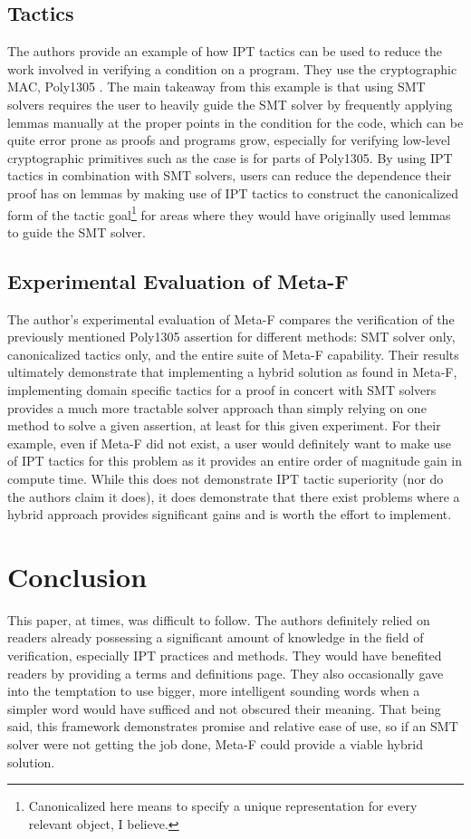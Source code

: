 \documentclass[10pt, journal]{IEEEtran}
\begin{document}
\subsection{Tactics}
The authors provide an example of how IPT tactics can be used to reduce the work involved in verifying a condition on a program. They use the cryptographic MAC, Poly1305 \cite{Bernstein2005}. The main takeaway from this example is that using SMT solvers requires the user to heavily guide the SMT solver by frequently applying lemmas manually at the proper points in the condition for the code, which can be quite error prone as proofs and programs grow, especially for verifying low-level cryptographic primitives such as the case is for parts of Poly1305. By using IPT tactics in combination with SMT solvers, users can reduce the dependence their proof has on lemmas by making use of IPT tactics to construct the canonicalized form of the tactic goal\footnote{Canonicalized here means to specify a unique representation for every relevant object, I believe.} for areas where they would have originally used lemmas to guide the SMT solver.

\subsection{Experimental Evaluation of Meta-F\text{*}}
The author's experimental evaluation of Meta-F\text{*} compares the verification of the previously mentioned Poly1305 assertion for different methods: SMT solver only, canonicalized tactics only, and the entire suite of Meta-F\text{*} capability. Their results ultimately demonstrate that implementing a hybrid solution as found in Meta-F\text{*}, implementing domain specific tactics for a proof in concert with SMT solvers provides a much more tractable solver approach than simply relying on one method to solve a given assertion, at least for this given experiment. For their example, even if Meta-F\text{*} did not exist, a user would definitely want to make use of IPT tactics for this problem as it provides an entire order of magnitude gain in compute time. While this does not demonstrate IPT tactic superiority (nor do the authors claim it does), it does demonstrate that there exist problems where a hybrid approach provides significant gains and is worth the effort to implement.

\section{Conclusion}
This paper, at times, was difficult to follow. The authors definitely relied on readers already possessing a significant amount of knowledge in the field of verification, especially IPT practices and methods. They would have benefited readers by providing a terms and definitions page. They also occasionally gave into the temptation to use bigger, more intelligent sounding words when a simpler word would have sufficed and not obscured their meaning. That being said, this framework demonstrates promise and relative ease of use, so if an SMT solver were not getting the job done, Meta-F\text{*} could provide a viable hybrid solution.


\end{document}
